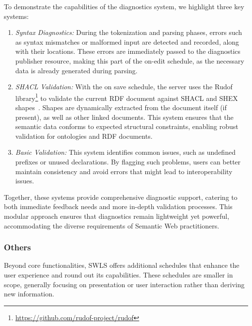 To demonstrate the capabilities of the diagnostics system, we highlight three key systems:

\begin{enumerate}
  \item \textit{Syntax Diagnostics:}
    During the tokenization and parsing phases, errors such as syntax mismatches or malformed input are detected and recorded, along with their locations.
    These errors are immediately passed to the diagnostics publisher resource, making this part of the on-edit schedule, as the necessary data is already generated during parsing.
  \item \textit{SHACL Validation:} 
    With the on save schedule, the server uses the Rudof library\footnote{\url{https://github.com/rudof-project/rudof}} to validate the current RDF document against SHACL and SHEX shapes~\cite{labra2022rudof}.
    Shapes are dynamically extracted from the document itself (if present), as well as other linked documents.
    This system ensures that the semantic data conforms to expected structural constraints, enabling robust validation for ontologies and RDF documents.
  \item \textit{Basic Validation:}
    This system identifies common issues, such as undefined prefixes or unused declarations.
    By flagging such problems, users can better maintain consistency and avoid errors that might lead to interoperability issues.
\end{enumerate}

Together, these systems provide comprehensive diagnostic support, catering to both immediate feedback needs and more in-depth validation processes.
This modular approach ensures that diagnostics remain lightweight yet powerful, accommodating the diverse requirements of Semantic Web practitioners.

\subsubsection{Others}

Beyond core functionalities, SWLS offers additional schedules that enhance the user experience and round out its capabilities.
These schedules are smaller in scope, generally focusing on presentation or user interaction rather than deriving new information.

